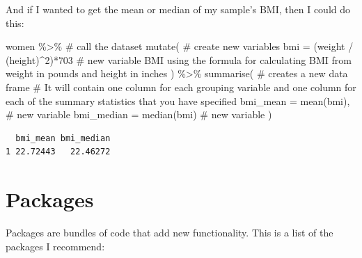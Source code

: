 \documentclass[
  letterpaper,
  DIV=11,
  numbers=noendperiod]{scrreprt}
\newenvironment{Shaded}{\begin{snugshade}}{\end{snugshade}}
\newcommand{\AttributeTok}[1]{\textcolor[rgb]{0.40,0.45,0.13}{#1}}
\newcommand{\CommentTok}[1]{\textcolor[rgb]{0.37,0.37,0.37}{#1}}
\newcommand{\DecValTok}[1]{\textcolor[rgb]{0.68,0.00,0.00}{#1}}
\newcommand{\FunctionTok}[1]{\textcolor[rgb]{0.28,0.35,0.67}{#1}}
\newcommand{\NormalTok}[1]{\textcolor[rgb]{0.00,0.23,0.31}{#1}}
\newcommand{\SpecialCharTok}[1]{\textcolor[rgb]{0.37,0.37,0.37}{#1}}
\begin{document}
And if I wanted to get the mean or median of my sample's BMI, then I
could do this:

\begin{Shaded}
\begin{Highlighting}[]
\NormalTok{women }\SpecialCharTok{\%\textgreater{}\%} \CommentTok{\# call the dataset}
  \FunctionTok{mutate}\NormalTok{( }\CommentTok{\# create new variables}
    \AttributeTok{bmi =}\NormalTok{ (weight }\SpecialCharTok{/}\NormalTok{ (height)}\SpecialCharTok{\^{}}\DecValTok{2}\NormalTok{)}\SpecialCharTok{*}\DecValTok{703} \CommentTok{\# new variable BMI using the formula for calculating BMI from weight in pounds and height in inches}
\NormalTok{  ) }\SpecialCharTok{\%\textgreater{}\%}
  \FunctionTok{summarise}\NormalTok{( }\CommentTok{\# creates a new data frame}
    \CommentTok{\# It will contain one column for each grouping variable and one column for each of the summary statistics that you have specified}
    \AttributeTok{bmi\_mean =} \FunctionTok{mean}\NormalTok{(bmi), }\CommentTok{\# new variable}
    \AttributeTok{bmi\_median =} \FunctionTok{median}\NormalTok{(bmi) }\CommentTok{\# new variable}
\NormalTok{  )}
\end{Highlighting}
\end{Shaded}

\begin{verbatim}
  bmi_mean bmi_median
1 22.72443   22.46272
\end{verbatim}

\hypertarget{packages}{%
\section{Packages}\label{packages}}

Packages are bundles of code that add new functionality. This is a list
of the packages I recommend:
\end{document}
